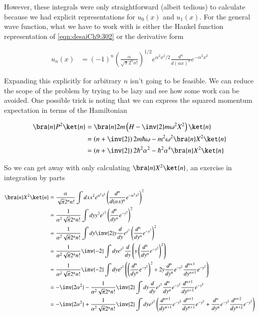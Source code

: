 However, these integrals were only straightforward (albeit tedious) to calculate because we had explicit representations for $u_0(x)$ and $u_1(x)$.  For the general wave function, what we have to work with is either the Hankel function representation of \ref{eqn:desaiCh9:302} or the derivative form

\begin{align}\label{eqn:desaiCh9:302b}
u_n(x) &= (-1)^n
\left( \frac{ \alpha}{\sqrt{\pi} 2^n n!} \right)^{1/2} 
e^{ \alpha^2 x^2/2}
\frac{d^n}{d (\alpha x)^n}
e^{ -\alpha^2 x^2}
\end{align}

Expanding this explicitly for arbitrary $n$ isn't going to be feasible.  We can reduce the scope of the problem by trying to be lazy and see how some work can be avoided.  One possible trick is noting that we can express the squared momentum expectation in terms of the Hamiltonian

\begin{align*}
\bra{n} P^2 \ket{n}
&=
\bra{n} 2m \left( H - \inv{2} m \omega^2 X^2 \right) \ket{n} \\
&=
\left( n + \inv{2} \right) 2 m \hbar \omega
- m^2 \omega^2 \bra{n} X^2 \ket{n} \\
&=
\left( n + \inv{2} \right) 2 \hbar^2 \alpha^2 
- \hbar^2 \alpha^4 \bra{n} X^2 \ket{n} \\
\end{align*}

So we can get away with only calculating $\bra{n} X^2 \ket{n}$, an exercise in integration by parts

\begin{align*}
\bra{n} X^2 \ket{n}
&=
\frac{ \alpha}{\sqrt{\pi} 2^n n!} 
\int dx x^2
e^{ \alpha^2 x^2}
\left(
\frac{d^n}{d (\alpha x)^n}
e^{ -\alpha^2 x^2}
\right)^2 \\
&=
\frac{ 1 }{\alpha^2 \sqrt{\pi} 2^n n!} 
\int dy y^2 
e^{ y^2}
\left(
\frac{d^n}{d y^n}
e^{ -y^2 }
\right)^2 \\
&=
\frac{ 1 }{\alpha^2 \sqrt{\pi} 2^n n!} 
\int dy \inv{2} y \frac{ d}{dy} e^{ y^2}
\left(
\frac{d^n}{d y^n}
e^{ -y^2 }
\right)^2 \\
&=
\frac{ 1 }{\alpha^2 \sqrt{\pi} 2^n n!} 
\inv{-2}
\int dy e^{ y^2}
\frac{d}{dy} \left( 
y 
\left(
\frac{d^n}{d y^n}
e^{ -y^2 }
\right)^2 
\right)
\\
&=
\frac{ 1 }{\alpha^2 \sqrt{\pi} 2^n n!} 
\inv{-2}
\int dy e^{ y^2}
\left( 
\left(
\frac{d^n}{d y^n}
e^{ -y^2 }
\right)^2 
+ 2 y 
\frac{d^n}{d y^n}
e^{ -y^2 }
\frac{d^{n+1}}{d y^{n+1}}
e^{ -y^2 }
\right)
\\
&=
-\inv{2 \alpha^2}
-
\frac{ 1 }{\alpha^2 \sqrt{\pi} 2^n n!} 
\inv{2}
\int dy \frac{d}{dy} e^{ y^2}
\frac{d^n}{d y^n}
e^{ -y^2 }
\frac{d^{n+1}}{d y^{n+1}}
e^{ -y^2 }
\\
&=
-\inv{2 \alpha^2}
+
\frac{ 1 }{\alpha^2 \sqrt{\pi} 2^n n!} 
\inv{2}
\int dy 
e^{ y^2}
\left(
\frac{d^{n+1}}{d y^{n+1}}
e^{ -y^2 }
\frac{d^{n+1}}{d y^{n+1}}
e^{ -y^2 }
+
\frac{d^n}{d y^n}
e^{ -y^2 }
\frac{d^{n+2}}{d y^{n+2}}
e^{ -y^2 }
\right)
\\
\end{align*}

